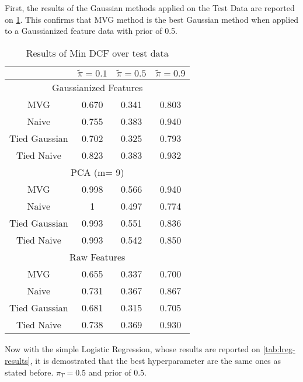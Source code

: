 \documentclass[12pt, twocolumn]{article}
\begin{document}
First, the results of the Gaussian methods applied on the Test Data are reported on \ref{tab:dcf-results}. This confirms that MVG method is the best Gaussian method when applied to a Gaussianized feature data with prior of 0.5.

\begin{table}[H]
\caption{\label{tab:dcf-results}Results of Min DCF over test data}
\begin{center}
\begin{tabular}{cccc}
\hline
\multicolumn{1}{l}{} & \textbf{$\tilde{\pi } = 0.1$} & \textbf{$\tilde{\pi }= 0.5$} & \multicolumn{1}{l}{\textbf{$\tilde{\pi}  = 0.9$}} \\ \hline
\multicolumn{4}{c}{Gaussianized Features}                  \\ \hline
\multicolumn{1}{c|}{MVG}           & 0.670 & 0.341 & 0.803 \\
\multicolumn{1}{c|}{Naive}         & 0.755 & 0.383 & 0.940 \\
\multicolumn{1}{c|}{Tied Gaussian} & 0.702 & 0.325 & 0.793 \\
\multicolumn{1}{c|}{Tied Naive}    & 0.823 & 0.383 & 0.932 \\ \hline
\multicolumn{4}{c}{PCA (m= 9)}                             \\ \hline
\multicolumn{1}{c|}{MVG}           & 0.998 & 0.566 & 0.940 \\
\multicolumn{1}{c|}{Naive}         & 1     & 0.497 & 0.774 \\
\multicolumn{1}{c|}{Tied Gaussian} & 0.993 & 0.551 & 0.836 \\
\multicolumn{1}{c|}{Tied Naive}    & 0.993 & 0.542 & 0.850 \\ \hline
\multicolumn{4}{c}{Raw Features}                           \\ \hline
\multicolumn{1}{c|}{MVG}           & 0.655 & 0.337 & 0.700 \\
\multicolumn{1}{c|}{Naive}         & 0.731 & 0.367 & 0.867 \\
\multicolumn{1}{c|}{Tied Gaussian} & 0.681 & 0.315 & 0.705 \\
\multicolumn{1}{c|}{Tied Naive}    & 0.738 & 0.369 & 0.930 \\ \hline
\end{tabular}
\end{center}
\end{table}

Now with the simple Logistic Regression, whose results are reported on \ref{tab:lreg-results}, it is demostrated that the best hyperparameter are 
the same ones as stated before. $\pi_T=0.5$ and prior of 0.5.
\end{document}
